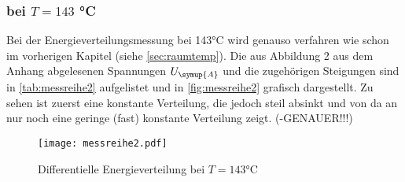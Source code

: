         \subsubsection{bei $T = 143$ °C}
        Bei der Energieverteilungsmessung bei 143°C wird genauso verfahren wie schon im vorherigen Kapitel (siehe \autoref{sec:raumtemp}).
        Die aus Abbildung 2 aus dem Anhang abgelesenen Spannungen $U_{\symup{A}}$ und die zugehörigen Steigungen sind in \autoref{tab:messreihe2} aufgelistet
        und in \autoref{fig:messreihe2} grafisch dargestellt. Zu sehen ist zuerst eine konstante Verteilung, die jedoch steil absinkt und von da an nur noch eine
        geringe (fast) konstante Verteilung zeigt. (-GENAUER!!!)
        
         \begin{figure}
          \centering
          \texttt{[image: messreihe2.pdf]}
          \caption{Differentielle Energieverteilung bei $T = 143$°C}
          \label{fig:messreihe2}
        \end{figure}
